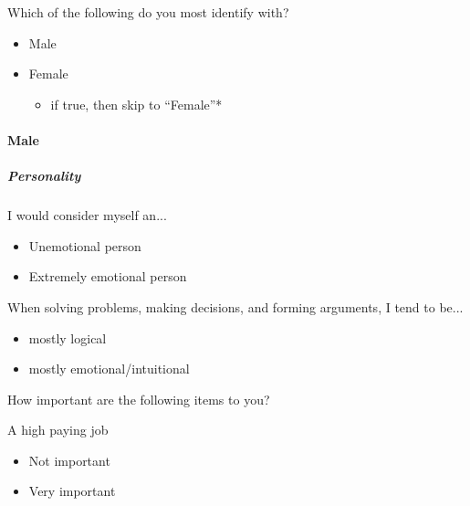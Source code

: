 \documentclass[twoside]{report}
\begin{document}
\begin{multicols*}{2}
\begin{multicols}{2}
Which of the following do you most identify with?

\begin{itemize}
\item
  Male
\end{itemize}

\begin{itemize}
\item
  Female

  \begin{itemize}
  \item
    if true, then skip to ``Female''*
  \end{itemize}
\end{itemize}

\paragraph{Male}

\subparagraph{Personality}

I would consider myself an...

\begin{itemize}
\item
  Unemotional person
\end{itemize}

\begin{itemize}
\item
  Extremely emotional person
\end{itemize}

When solving problems, making decisions, and forming arguments, I tend
to be...

\begin{itemize}
\item
  mostly logical
\end{itemize}

\begin{itemize}
\item
  mostly emotional/intuitional
\end{itemize}

How important are the following items to you?

A high paying job

\begin{itemize}
\item
  Not important
\end{itemize}

\begin{itemize}
\item
  Very important
\end{itemize}


\end{multicols}
\end{multicols*}
\end{document}
